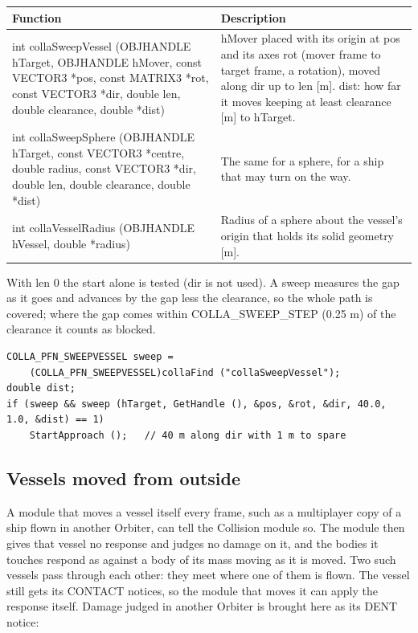 \documentclass[Orbiter Developer Manual.tex]{subfiles}
\begin{document}
\begin{sloppypar}
	\begin{longtable}{ |p{}|p{}| }
	\hline\rule{0pt}{2ex}
	\textbf{Function} & \textbf{Description}\\
	\hline\rule{0pt}{2ex}
	int collaSweepVessel (OBJHANDLE hTarget, OBJHANDLE hMover, const VECTOR3 *pos, const MATRIX3 *rot, const VECTOR3 *dir, double len, double clearance, double *dist) & hMover placed with its origin at pos and its axes rot (mover frame to target frame, a rotation), moved along dir up to len [m]. dist: how far it moves keeping at least clearance [m] to hTarget.\\
	\hline\rule{0pt}{2ex}
	int collaSweepSphere (OBJHANDLE hTarget, const VECTOR3 *centre, double radius, const VECTOR3 *dir, double len, double clearance, double *dist) & The same for a sphere, for a ship that may turn on the way.\\
	\hline\rule{0pt}{2ex}
	int collaVesselRadius (OBJHANDLE hVessel, double *radius) & Radius of a sphere about the vessel's origin that holds its solid geometry [m].\\
	\hline
	\end{longtable}

With len 0 the start alone is tested (dir is not used). A sweep measures the gap as it goes and advances by the gap less the clearance, so the whole path is covered; where the gap comes within COLLA\_SWEEP\_STEP (0.25 m) of the clearance it counts as blocked.

\begin{lstlisting}
COLLA_PFN_SWEEPVESSEL sweep =
    (COLLA_PFN_SWEEPVESSEL)collaFind ("collaSweepVessel");
double dist;
if (sweep && sweep (hTarget, GetHandle (), &pos, &rot, &dir, 40.0, 1.0, &dist) == 1)
    StartApproach ();   // 40 m along dir with 1 m to spare
\end{lstlisting}


\subsection{Vessels moved from outside}
A module that moves a vessel itself every frame, such as a multiplayer copy of a ship flown in another Orbiter, can tell the Collision module so. The module then gives that vessel no response and judges no damage on it, and the bodies it touches respond as against a body of its mass moving as it is moved. Two such vessels pass through each other: they meet where one of them is flown. The vessel still gets its CONTACT notices, so the module that moves it can apply the response itself. Damage judged in another Orbiter is brought here as its DENT notice:


\end{sloppypar}
\end{document}
